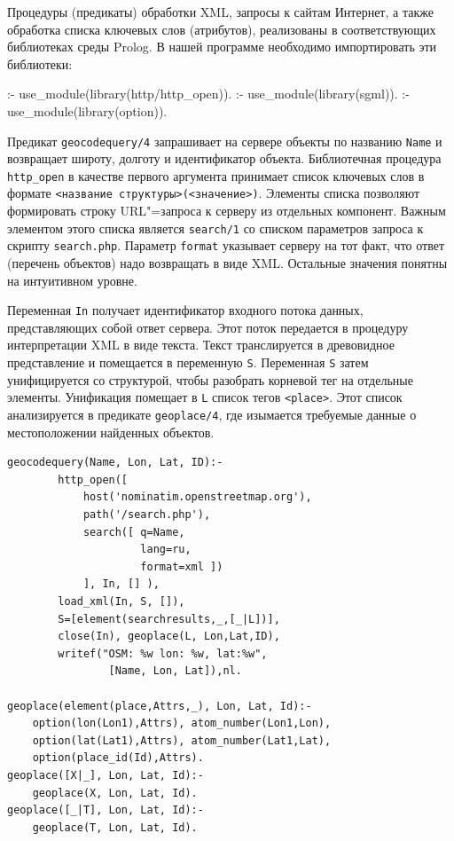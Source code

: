 \documentclass[a4paper,14pt, openany, twoside, draft]{extbook} %
\begin{document}
Процедуры (предикаты) обработки XML, запросы к сайтам Интернет, а также обработка списка ключевых слов (атрибутов), реализованы в соответствующих библиотеках среды Pro\-log.  В нашей программе необходимо импортировать эти библиотеки:

\begin{proexp}
:- use_module(library(http/http_open)).
:- use_module(library(sgml)).   %
:- use_module(library(option)).
\end{proexp}


Предикат \texttt{geocodequery/4} запрашивает на сервере объекты по названию \texttt{Name} и возвращает широту, долготу и идентификатор объекта.  Библиотечная процедура \texttt{http\_open} в качестве первого аргумента принимает список ключевых слов в формате \texttt{<название структуры>(<значение>)}.  Элементы списка позволяют формировать строку URL"=запроса к серверу из отдельных компонент.  Важным элементом этого списка является \texttt{search/1} со списком параметров запроса к скрипту \texttt{search.php}.  Параметр \texttt{format} указывает серверу на тот факт, что ответ (перечень объектов) надо возвращать в виде XML.  Остальные значения понятны на интуитивном уровне.

Переменная \texttt{In} получает идентификатор входного потока данных, представляющих собой ответ сервера.  Этот поток передается в процедуру интерпретации XML в виде текста.  Текст транслируется в древовидное представление и помещается в переменную \texttt{S}.  Переменная \texttt{S} затем унифицируется со структурой, чтобы разобрать корневой тег на отдельные элементы.  Унификация помещает в \texttt{L} список тегов \texttt{<place>}.  Этот список анализируется в предикате \texttt{geoplace/4}, где изымается требуемые данные о местоположении найденных объектов.

\begin{verbatim}
geocodequery(Name, Lon, Lat, ID):-
        http_open([
            host('nominatim.openstreetmap.org'),
            path('/search.php'),
            search([ q=Name,
                     lang=ru,
                     format=xml ])
            ], In, [] ),
        load_xml(In, S, []),
        S=[element(searchresults,_,[_|L])],
        close(In), geoplace(L, Lon,Lat,ID),
        writef("OSM: %w lon: %w, lat:%w",
                [Name, Lon, Lat]),nl.

geoplace(element(place,Attrs,_), Lon, Lat, Id):-
    option(lon(Lon1),Attrs), atom_number(Lon1,Lon),
    option(lat(Lat1),Attrs), atom_number(Lat1,Lat),
    option(place_id(Id),Attrs).
geoplace([X|_], Lon, Lat, Id):-
    geoplace(X, Lon, Lat, Id).
geoplace([_|T], Lon, Lat, Id):-
    geoplace(T, Lon, Lat, Id).
\end{verbatim}
\end{document}

